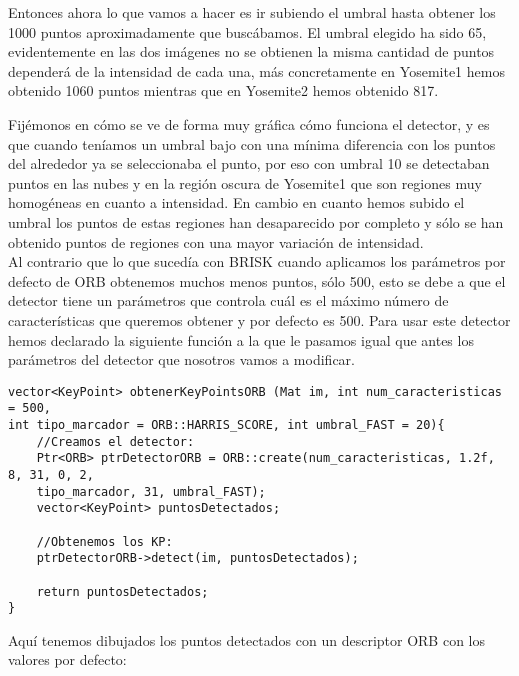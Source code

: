 \documentclass[10pt,a4paper]{article}
\begin{document}
Entonces ahora lo que vamos a hacer es ir subiendo el umbral hasta obtener los 1000 puntos aproximadamente que buscábamos. El umbral elegido ha sido 65, evidentemente en las dos imágenes no se obtienen la misma cantidad de puntos dependerá de la intensidad de cada una, más concretamente en Yosemite1 hemos obtenido 1060 puntos mientras que en Yosemite2 hemos obtenido 817.\\

\begin{figure}[H]
\centering
{}
\end{figure}

Fijémonos en cómo se ve de forma muy gráfica cómo funciona el detector, y es que cuando teníamos un umbral bajo con una mínima diferencia con los puntos del alrededor ya se seleccionaba el punto, por eso con umbral 10 se detectaban puntos en las nubes y en la región oscura de Yosemite1 que son regiones muy homogéneas en cuanto a intensidad. En cambio en cuanto hemos subido el umbral los puntos de estas regiones han desaparecido por completo y sólo se han obtenido puntos de regiones con una mayor variación de intensidad.\\


Al contrario que lo que sucedía con BRISK cuando aplicamos los parámetros por defecto de ORB obtenemos muchos menos puntos, sólo 500, esto se debe a que el detector tiene un parámetros que controla cuál es el máximo número de características que queremos obtener y por defecto es 500. Para usar este detector hemos declarado la siguiente función a la que le pasamos igual que antes los parámetros del detector que nosotros vamos a modificar.\\

\begin{lstlisting}
vector<KeyPoint> obtenerKeyPointsORB (Mat im, int num_caracteristicas = 500,
int tipo_marcador = ORB::HARRIS_SCORE, int umbral_FAST = 20){
	//Creamos el detector:
	Ptr<ORB> ptrDetectorORB = ORB::create(num_caracteristicas, 1.2f, 8, 31, 0, 2,
	tipo_marcador, 31, umbral_FAST);
	vector<KeyPoint> puntosDetectados;
	
	//Obtenemos los KP:
	ptrDetectorORB->detect(im, puntosDetectados);

	return puntosDetectados;
}
\end{lstlisting}

Aquí tenemos dibujados los puntos detectados con un descriptor ORB con los valores por defecto:\\
\end{document}
